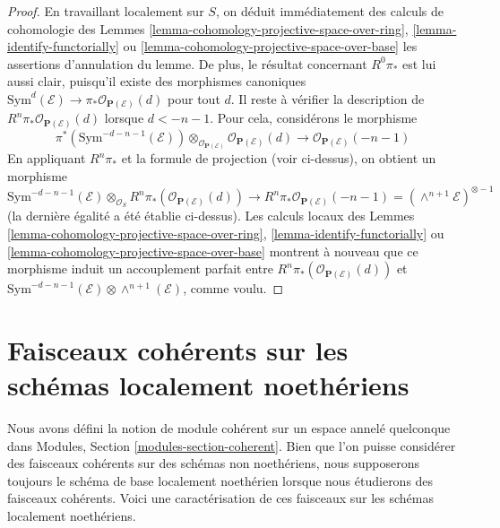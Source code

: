 \begin{proof}
\medskip\noindent
En travaillant localement sur $S$, on déduit immédiatement des calculs de
cohomologie des Lemmes \ref{lemma-cohomology-projective-space-over-ring},
\ref{lemma-identify-functorially} ou
\ref{lemma-cohomology-projective-space-over-base} les assertions
d'annulation du lemme. De plus, le résultat concernant $R^0\pi_*$ est lui aussi clair,
puisqu'il existe des morphismes canoniques
$\text{Sym}^d(\mathcal{E}) \to \pi_* \mathcal{O}_{\mathbf{P}(\mathcal{E})}(d)$
pour tout $d$. Il reste à vérifier la description de
$R^n\pi_*\mathcal{O}_{\mathbf{P}(\mathcal{E})}(d)$
lorsque $d < -n - 1$. Pour cela, considérons le morphisme
$$
\pi^*(\text{Sym}^{-d - n - 1}(\mathcal{E}))
\otimes_{\mathcal{O}_{\mathbf{P}(\mathcal{E})}}
\mathcal{O}_{\mathbf{P}(\mathcal{E})}(d)
\longrightarrow
\mathcal{O}_{\mathbf{P}(\mathcal{E})}(-n - 1)
$$
En appliquant $R^n\pi_*$ et la formule de projection (voir ci-dessus), on obtient un morphisme
$$
\text{Sym}^{-d - n - 1}(\mathcal{E})
\otimes_{\mathcal{O}_S}
R^n\pi_*(\mathcal{O}_{\mathbf{P}(\mathcal{E})}(d))
\longrightarrow
R^n\pi_*\mathcal{O}_{\mathbf{P}(\mathcal{E})}(-n - 1) =
(\wedge^{n + 1}\mathcal{E})^{\otimes -1}
$$
(la dernière égalité a été établie ci-dessus).
Les calculs locaux des Lemmes
\ref{lemma-cohomology-projective-space-over-ring},
\ref{lemma-identify-functorially} ou
\ref{lemma-cohomology-projective-space-over-base}
montrent à nouveau que ce morphisme induit un accouplement parfait entre
$R^n\pi_*(\mathcal{O}_{\mathbf{P}(\mathcal{E})}(d))$ et
$\text{Sym}^{-d - n - 1}(\mathcal{E}) \otimes \wedge^{n + 1}(\mathcal{E})$,
comme voulu.
\end{proof}















\section{Faisceaux cohérents sur les schémas localement noethériens}
\label{section-coherent-sheaves}

\noindent
Nous avons défini la notion de module cohérent sur un espace annelé quelconque dans
Modules, Section \ref{modules-section-coherent}.
Bien que l'on puisse considérer des faisceaux cohérents sur des schémas
non noethériens, nous supposerons toujours le schéma de base localement noethérien
lorsque nous étudierons des faisceaux cohérents. Voici une caractérisation
de ces faisceaux sur les schémas localement noethériens.

